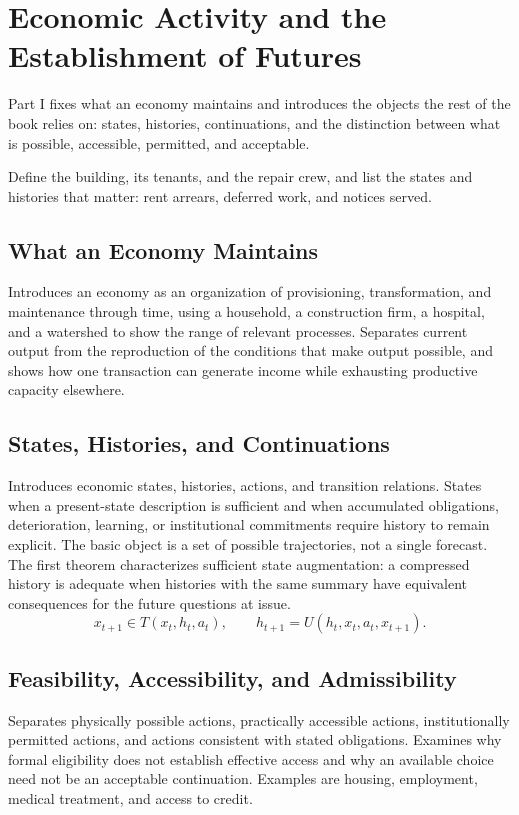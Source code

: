 \part{Economic Activity and the Establishment of Futures}
\label{part:I}

Part I fixes what an economy maintains and introduces the objects the rest of the book relies on: states, histories, continuations, and the distinction between what is possible, accessible, permitted, and acceptable.

\begin{housing}Define the building, its tenants, and the repair crew, and list the states and histories that matter: rent arrears, deferred work, and notices served.\end{housing}

\chapter{What an Economy Maintains}\label{ch:1}
Introduces an economy as an organization of provisioning, transformation, and maintenance through time, using a household, a construction firm, a hospital, and a watershed to show the range of relevant processes. Separates current output from the reproduction of the conditions that make output possible, and shows how one transaction can generate income while exhausting productive capacity elsewhere.
\scaffold

\chapter{States, Histories, and Continuations}\label{ch:2}
Introduces economic states, histories, actions, and transition relations. States when a present-state description is sufficient and when accumulated obligations, deterioration, learning, or institutional commitments require history to remain explicit. The basic object is a set of possible trajectories, not a single forecast. The first theorem characterizes sufficient state augmentation: a compressed history is adequate when histories with the same summary have equivalent consequences for the future questions at issue.
\[
x_{t+1}\in T(x_t,h_t,a_t),\qquad h_{t+1}=U(h_t,x_t,a_t,x_{t+1}).
\]
\scaffold

\chapter{Feasibility, Accessibility, and Admissibility}\label{ch:3}
Separates physically possible actions, practically accessible actions, institutionally permitted actions, and actions consistent with stated obligations. Examines why formal eligibility does not establish effective access and why an available choice need not be an acceptable continuation. Examples are housing, employment, medical treatment, and access to credit.
\scaffold

